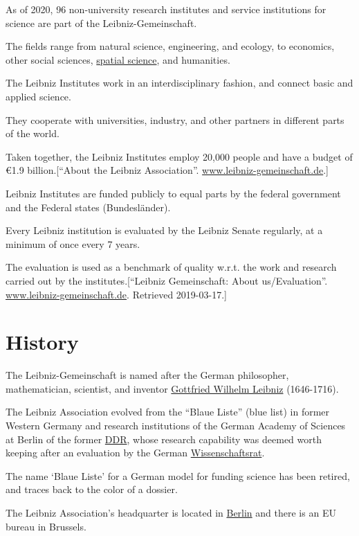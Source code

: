\documentclass{book}
\numberwithin{equation}{section}
\begin{document}
%
As of 2020, 96 non-university research institutes and service institutions for science are part of the Leibniz-Gemeinschaft.

The fields range from natural science, engineering, and ecology, to economics, other social sciences, \href{https://en.wikipedia.org/wiki/Spatial_science}{spatial science}, and humanities.

The Leibniz Institutes work in an interdisciplinary fashion, and connect basic and applied science.

They cooperate with universities, industry, and other partners in different parts of the world.

Taken together, the Leibniz Institutes employ 20,000 people and have a budget of €1.9 billion.[``About the Leibniz Association''. \url{www.leibniz-gemeinschaft.de}.]

Leibniz Institutes are funded publicly to equal parts by the federal government and the Federal states (Bundesländer).

%
Every Leibniz institution is evaluated by the Leibniz Senate regularly, at a minimum of once every 7 years.

The evaluation is used as a benchmark of quality w.r.t. the work and research carried out by the institutes.[``Leibniz Gemeinschaft: About us/Evaluation''. \url{www.leibniz-gemeinschaft.de}. Retrieved 2019-03-17.]

\section{History}
The Leibniz-Gemeinschaft is named after the German philosopher, mathematician, scientist, and inventor \href{https://en.wikipedia.org/wiki/Gottfried_Wilhelm_Leibniz}{Gottfried Wilhelm Leibniz} (1646-1716).

%
The Leibniz Association evolved from the ``Blaue Liste'' (blue list) in former Western Germany and research institutions of the German Academy of Sciences at Berlin of the former \href{https://en.wikipedia.org/wiki/German_Democratic_Republic}{DDR}, whose research capability was deemed worth keeping after an evaluation by the German \href{https://en.wikipedia.org/wiki/Wissenschaftsrat}{Wissenschaftsrat}.

The name `Blaue Liste' for a German model for funding science has been retired, and traces back to the color of a dossier.

%
The Leibniz Association's headquarter is located in \href{https://en.wikipedia.org/wiki/Berlin}{Berlin} and there is an EU bureau in Brussels.
\end{document}
